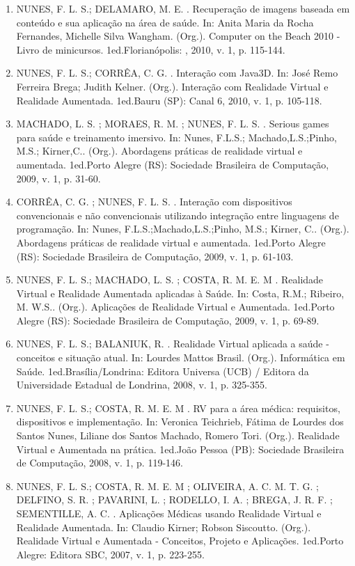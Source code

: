 \documentclass[11pt,a4paper,sans]{moderncv} %
\begin{document}
\begin{enumerate}
    \item NUNES, F. L. S.; DELAMARO, M. E. . Recuperação de imagens baseada em conteúdo e sua aplicação na área de saúde. In: Anita Maria da Rocha Fernandes, Michelle Silva Wangham. (Org.). Computer on the Beach 2010 - Livro de minicursos. 1ed.Florianópolis: , 2010, v. 1, p. 115-144.
    \item NUNES, F. L. S.; CORRÊA, C. G. . Interação com Java3D. In: José Remo Ferreira Brega; Judith Kelner. (Org.). Interação com Realidade Virtual e Realidade Aumentada. 1ed.Bauru (SP): Canal 6, 2010, v. 1, p. 105-118.
    \item MACHADO, L. S. ; MORAES, R. M. ; NUNES, F. L. S. . Serious games para saúde e treinamento imersivo. In: Nunes, F.L.S.; Machado,L.S.;Pinho, M.S.; Kirner,C.. (Org.). Abordagens práticas de realidade virtual e aumentada. 1ed.Porto Alegre (RS): Sociedade Brasileira de Computação, 2009, v. 1, p. 31-60.
    \item CORRÊA, C. G. ; NUNES, F. L. S. . Interação com dispositivos convencionais e não convencionais utilizando integração entre linguagens de programação. In: Nunes, F.L.S.;Machado,L.S.;Pinho, M.S.; Kirner, C.. (Org.). Abordagens práticas de realidade virtual e aumentada. 1ed.Porto Alegre (RS): Sociedade Brasileira de Computação, 2009, v. 1, p. 61-103.
    \item NUNES, F. L. S.; MACHADO, L. S. ; COSTA, R. M. E. M . Realidade Virtual e Realidade Aumentada aplicadas à Saúde. In: Costa, R.M.; Ribeiro, M. W.S.. (Org.). Aplicações de Realidade Virtual e Aumentada. 1ed.Porto Alegre (RS): Sociedade Brasileira de Computação, 2009, v. 1, p. 69-89.
    \item NUNES, F. L. S.; BALANIUK, R. . Realidade Virtual aplicada a saúde - conceitos e situação atual. In: Lourdes Mattos Brasil. (Org.). Informática em Saúde. 1ed.Brasília/Londrina: Editora Universa (UCB) / Editora da Universidade Estadual de Londrina, 2008, v. 1, p. 325-355.
    \item NUNES, F. L. S.; COSTA, R. M. E. M . RV para a área médica: requisitos, dispositivos e implementação. In: Veronica Teichrieb, Fátima de Lourdes dos Santos Nunes, Liliane dos Santos Machado, Romero Tori. (Org.). Realidade Virtual e Aumentada na prática. 1ed.João Pessoa (PB): Sociedade Brasileira de Computação, 2008, v. 1, p. 119-146.
    \item NUNES, F. L. S.; COSTA, R. M. E. M ; OLIVEIRA, A. C. M. T. G. ; DELFINO, S. R. ; PAVARINI, L. ; RODELLO, I. A. ; BREGA, J. R. F. ; SEMENTILLE, A. C. . Aplicações Médicas usando Realidade Virtual e Realidade Aumentada. In: Claudio Kirner; Robson Siscoutto. (Org.). Realidade Virtual e Aumentada - Conceitos, Projeto e Aplicações. 1ed.Porto Alegre: Editora SBC, 2007, v. 1, p. 223-255.

\end{enumerate}
\end{document}
